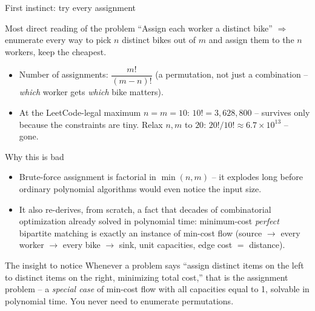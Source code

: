 \documentclass[11pt,aspectratio=169]{beamer}
\begin{document}
\begin{frame}{First instinct: try every assignment}
  \begin{block}{Most direct reading of the problem}
    ``Assign each worker a distinct bike'' $\Rightarrow$ enumerate every way to pick
    $n$ distinct bikes out of $m$ and assign them to the $n$ workers, keep the
    cheapest.
  \end{block}
  \begin{itemize}
    \item Number of assignments: $\dfrac{m!}{(m-n)!}$ (a permutation, not just a
    combination -- \emph{which} worker gets \emph{which} bike matters).
    \item At the LeetCode-legal maximum $n=m=10$: $10! = 3{,}628{,}800$ -- survives
    only because the constraints are tiny. Relax $n,m$ to $20$: $20!/10! \approx
    6.7\times10^{13}$ -- gone.
  \end{itemize}
\end{frame}

\begin{frame}{Why this is bad}
  \begin{itemize}
    \item Brute-force assignment is factorial in $\min(n,m)$ -- it explodes long
    before ordinary polynomial algorithms would even notice the input size.
    \item It also re-derives, from scratch, a fact that decades of combinatorial
    optimization already solved in polynomial time: minimum-cost \emph{perfect}
    bipartite matching is exactly an instance of min-cost flow (source $\to$ every
    worker $\to$ every bike $\to$ sink, unit capacities, edge cost $=$ distance).
  \end{itemize}
  \begin{alertblock}{The insight to notice}
    Whenever a problem says ``assign distinct items on the left to distinct items on
    the right, minimizing total cost,'' that is the assignment problem -- a
    \emph{special case} of min-cost flow with all capacities equal to 1, solvable in
    polynomial time. You never need to enumerate permutations.
  \end{alertblock}
\end{frame}
\end{document}
